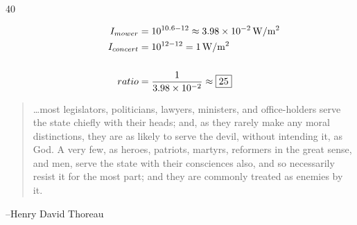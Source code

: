 \documentclass{exam}
\begin{document}
\begin{description}
      \item[40]
        \begin{align*}
          I_{mower}   & = 10^{10.6 - 12} \approx \unit[3.98 \times 10^{-2}]{W/m^2} \\
          I_{concert} & = 10^{12 - 12} = \unit[1]{W/m^2} \\
          \\
          ratio       & = \frac{1}{3.98 \times 10^{-2}} \approx \boxed{25} \\
        \end{align*}

    \end{description}

  \else
    \vspace{1 cm}
    \begin{quote}
      \begin{em}
        \ldots most legislators, politicians, lawyers, ministers, and office-holders serve the state chiefly with their
        heads; and, as they rarely make any moral distinctions, they are as likely to serve the devil, without intending
        it, as God. A very few, as heroes, patriots, martyrs, reformers in the great sense, and men, serve the state with
        their consciences also, and so necessarily resist it for the most part; and they are commonly treated as enemies
        by it.      
      \end{em}
    \end{quote}
    \hspace{1 cm} --Henry David Thoreau
  \fi



\end{document}
